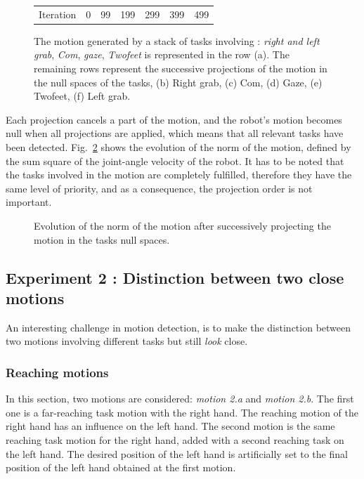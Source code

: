 \documentclass[letterpaper, 10pt, conference]{ieeeconf}      %
\begin{document}
\begin{figure}[t]
\begin{tabular}{c@{}c@{}c@{}c@{}c@{}c@{}c}
\\
Iteration & 0 & 99 & 199 & 299 & 399 & 499\\
\end{tabular}
\caption{The motion generated by a stack of tasks involving :
\emph{right and left grab}, \emph{Com}, \emph{gaze}, \emph{Twofeet} is represented in the row (a).
The remaining rows represent the successive projections of the motion in the null spaces of the tasks,
(b) Right grab, (c) Com, (d) Gaze, (e) Twofeet, (f) Left grab.}
\label{fig:snapshotXpqdot}
\end{figure}
Each projection cancels a part of the motion, and the robot's motion becomes null when all
projections are applied,
which means that all relevant tasks have been detected.
Fig.~\ref{fig:xp3Pqdot} shows the evolution of the norm of the motion,
defined by the sum square of the joint-angle velocity of the robot.
It has to be noted that the tasks involved in the motion are completely fulfilled,
therefore they have the same level of priority, and as a consequence, the projection
order is not important.
\begin{figure}[t]
\begin{center}
\resizebox{.48\textwidth}{!} {
      
    }
\end{center}
\caption{Evolution of the norm of the motion after successively projecting the motion in the
	tasks null spaces.}
\label{fig:xp3Pqdot}
\end{figure}

\subsection{Experiment 2 : Distinction between two close motions}
\label{sec:distinc}
An interesting challenge in motion detection,
is to make the distinction between two motions
involving different tasks but still \emph{look} close.

\subsubsection{Reaching motions}
\label{sec:distinc1}
In this section, two motions are considered: \emph{motion 2.a} and \emph{motion 2.b}.
The first one is a far-reaching task motion with the right hand.
The reaching motion of the right hand has an influence on the left hand.
The second motion is the same reaching task motion for the right hand, added with a
second reaching task on the left hand. The desired position of the left
hand is artificially set to the final position of the left hand obtained at the first motion.
\end{document}

